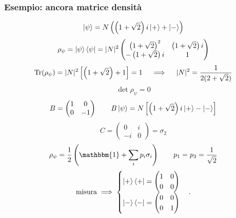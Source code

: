 \subsubsection{Esempio: ancora matrice densità}
\[
\ket{\psi} = N \left( \left( 1 + \sqrt{2} \right) i \ket{+} + \ket{-} \right)
\]
\[
\rho_\psi = \ket{\psi} \bra{\psi} = |N|^2 \begin{pmatrix}
\left( 1 + \sqrt{2} \right)^2 & \left( 1 + \sqrt{2} \right) i \\
-\left( 1 + \sqrt{2} \right) i & 1
\end{pmatrix}
\]
\[
\operatorname{Tr}(\rho_\psi) = |N|^2 \left[ \left( 1 + \sqrt{2} \right) + 1 \right] = 1 \quad \implies \quad |N|^2 = \frac{1}{2(2 + \sqrt{2})}
\]
\[
\det \rho_\psi = 0
\]
\[
B = \begin{pmatrix}
1 & 0 \\
0 & -1
\end{pmatrix} \qquad B \ket{\psi} = N \left[ \left( 1 + \sqrt{2} \right) i \ket{+} - \ket{-} \right]
\]
\[
C = \begin{pmatrix}
0 & i \\
-i & 0
\end{pmatrix} = \sigma_2
\]
\[
\rho_\psi = \frac{1}{2} \left( \mathbbm{1} + \sum_i p_i \sigma_i \right) \qquad p_1 = p_3 = \frac{1}{\sqrt{2}}
\]
\[
\mathrm{misura} \implies \begin{cases}
\ket{+}\bra{+} = \begin{pmatrix} 1 & 0 \\ 0 & 0 \end{pmatrix} \\
\ket{-}\bra{-} = \begin{pmatrix} 0 & 0 \\ 0 & 1 \end{pmatrix}
\end{cases}.
\]